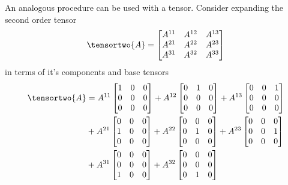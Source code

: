 An analogous procedure can be used with a tensor. Consider expanding the second order tensor
\begin{equation}
  \tensortwo{A}=\begin{bmatrix}
  A^{11} & A^{12} & A^{13} \\
  A^{21} & A^{22} & A^{23} \\
  A^{31} & A^{32} & A^{33}
  \end{bmatrix}
  \label{eqn:VoigtNotationSecondOrderTensor}
\end{equation}
in terms of it's components and base tensors \ie
\begin{equation}
  \begin{aligned}  
    \tensortwo{A}&=A^{11}\begin{bmatrix} 1 & 0 & 0 \\ 0 & 0 & 0 \\ 0 & 0 & 0 \end{bmatrix}
    +A^{12}\begin{bmatrix} 0 & 1 & 0 \\ 0 & 0 & 0 \\ 0 & 0 & 0 \end{bmatrix}
    +A^{13}\begin{bmatrix} 0 & 0 & 1 \\ 0 & 0 & 0 \\ 0 & 0 & 0 \end{bmatrix} \\
    &+A^{21}\begin{bmatrix} 0 & 0 & 0 \\ 1 & 0 & 0 \\ 0 & 0 & 0 \end{bmatrix}
    +A^{22}\begin{bmatrix} 0 & 0 & 0 \\ 0 & 1 & 0 \\ 0 & 0 & 0 \end{bmatrix}
    +A^{23}\begin{bmatrix} 0 & 0 & 0 \\ 0 & 0 & 1 \\ 0 & 0 & 0 \end{bmatrix} \\
    &+A^{31}\begin{bmatrix} 0 & 0 & 0 \\ 0 & 0 & 0 \\ 1 & 0 & 0 \end{bmatrix}
    +A^{32}\begin{bmatrix} 0 & 0 & 0 \\ 0 & 0 & 0 \\ 0 & 1 & 0 \end{bmatrix}

\end{aligned}
\end{equation}

